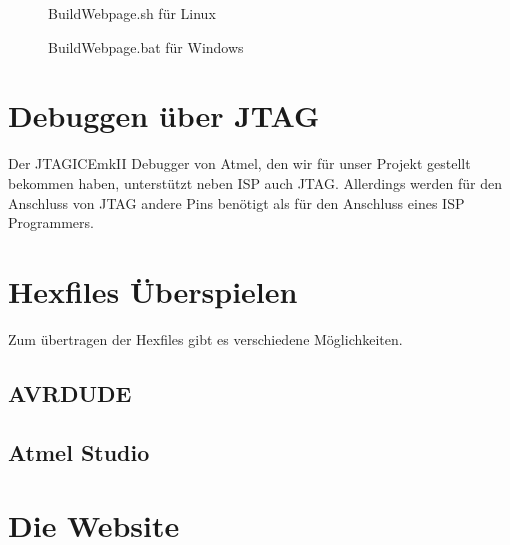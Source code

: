 \begin{figure}[H]

\caption{BuildWebpage.sh für Linux}
\label{output}
\end{figure}

\begin{figure}[H]

\caption{BuildWebpage.bat für Windows}
\label{output}
\end{figure}

\section{Debuggen über JTAG}

Der JTAGICEmkII Debugger von Atmel, den wir für unser Projekt gestellt bekommen
haben, unterstützt neben ISP auch JTAG. Allerdings werden für den Anschluss von
JTAG andere Pins benötigt als für den Anschluss eines ISP Programmers.


\section{Hexfiles Überspielen}

Zum übertragen der Hexfiles gibt es verschiedene Möglichkeiten.

\subsection{AVRDUDE}



\subsection{Atmel Studio}

\section{Die Website}
